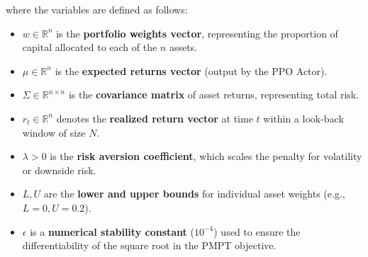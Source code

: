 \documentclass[final]{article}
\begin{document}
where the variables are defined as follows:
\begin{itemize}
    \item $w \in \mathbb{R}^n$ is the \textbf{portfolio weights vector}, representing the proportion of capital allocated to each of the $n$ assets.
    \item $\mu \in \mathbb{R}^n$ is the \textbf{expected returns vector} (output by the PPO Actor).
    \item $\Sigma \in \mathbb{R}^{n \times n}$ is the \textbf{covariance matrix} of asset returns, representing total risk.
    \item $r_t \in \mathbb{R}^n$ denotes the \textbf{realized return vector} at time $t$ within a look-back window of size $N$.
    \item $\lambda > 0$ is the \textbf{risk aversion coefficient}, which scales the penalty for volatility or downside risk.
    \item $L, U$ are the \textbf{lower and upper bounds} for individual asset weights (e.g., $L=0, U=0.2$).
    \item $\epsilon$ is a \textbf{numerical stability constant} ($10^{-4}$) used to ensure the differentiability of the square root in the PMPT objective.
\end{itemize}
\end{document}

